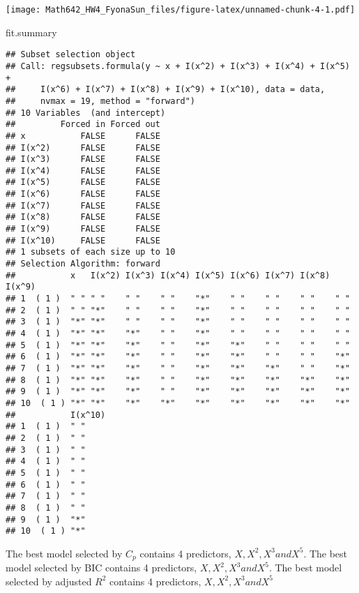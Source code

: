 \documentclass[]{article}
\newenvironment{Shaded}{\begin{snugshade}}{\end{snugshade}}
\newcommand{\NormalTok}[1]{{#1}}
\begin{document}
\texttt{[image: Math642\_HW4\_FyonaSun\_files/figure-latex/unnamed-chunk-4-1.pdf]}

\begin{Shaded}
\begin{Highlighting}[]
\NormalTok{fit.summary}
\end{Highlighting}
\end{Shaded}

\begin{verbatim}
## Subset selection object
## Call: regsubsets.formula(y ~ x + I(x^2) + I(x^3) + I(x^4) + I(x^5) + 
##     I(x^6) + I(x^7) + I(x^8) + I(x^9) + I(x^10), data = data, 
##     nvmax = 19, method = "forward")
## 10 Variables  (and intercept)
##         Forced in Forced out
## x           FALSE      FALSE
## I(x^2)      FALSE      FALSE
## I(x^3)      FALSE      FALSE
## I(x^4)      FALSE      FALSE
## I(x^5)      FALSE      FALSE
## I(x^6)      FALSE      FALSE
## I(x^7)      FALSE      FALSE
## I(x^8)      FALSE      FALSE
## I(x^9)      FALSE      FALSE
## I(x^10)     FALSE      FALSE
## 1 subsets of each size up to 10
## Selection Algorithm: forward
##           x   I(x^2) I(x^3) I(x^4) I(x^5) I(x^6) I(x^7) I(x^8) I(x^9)
## 1  ( 1 )  " " " "    " "    " "    "*"    " "    " "    " "    " "   
## 2  ( 1 )  " " "*"    " "    " "    "*"    " "    " "    " "    " "   
## 3  ( 1 )  "*" "*"    " "    " "    "*"    " "    " "    " "    " "   
## 4  ( 1 )  "*" "*"    "*"    " "    "*"    " "    " "    " "    " "   
## 5  ( 1 )  "*" "*"    "*"    " "    "*"    "*"    " "    " "    " "   
## 6  ( 1 )  "*" "*"    "*"    " "    "*"    "*"    " "    " "    "*"   
## 7  ( 1 )  "*" "*"    "*"    " "    "*"    "*"    "*"    " "    "*"   
## 8  ( 1 )  "*" "*"    "*"    " "    "*"    "*"    "*"    "*"    "*"   
## 9  ( 1 )  "*" "*"    "*"    " "    "*"    "*"    "*"    "*"    "*"   
## 10  ( 1 ) "*" "*"    "*"    "*"    "*"    "*"    "*"    "*"    "*"   
##           I(x^10)
## 1  ( 1 )  " "    
## 2  ( 1 )  " "    
## 3  ( 1 )  " "    
## 4  ( 1 )  " "    
## 5  ( 1 )  " "    
## 6  ( 1 )  " "    
## 7  ( 1 )  " "    
## 8  ( 1 )  " "    
## 9  ( 1 )  "*"    
## 10  ( 1 ) "*"
\end{verbatim}

The best model selected by \(C_p\) contains 4 predictors,
\(X, X^2, X^3 and X^5\). The best model selected by BIC contains 4
predictors, \(X, X^2, X^3 and X^5\). The best model selected by adjusted
\(R^2\) contains 4 predictors, \(X, X^2, X^3 and X^5\)
\end{document}
